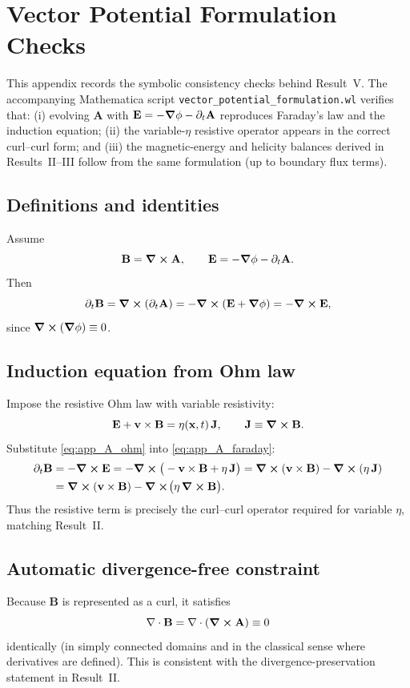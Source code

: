 \documentclass[11pt]{article}
\theoremstyle{plain}
\theoremstyle{definition}
\theoremstyle{remark}
\newcommand{\diver}{\nabla\cdot}
\newcommand{\A}{\mathbf{A}}
\newcommand{\B}{\mathbf{B}}
\newcommand{\E}{\mathbf{E}}
\newcommand{\J}{\mathbf{J}}
\newcommand{\vfield}{\mathbf{v}}
\begin{document}
\section{Vector Potential Formulation Checks}\label{sec:app_vector_potential}

This appendix records the symbolic consistency checks behind Result~V. The accompanying Mathematica
script \texttt{vector\_potential\_formulation.wl} verifies that: (i) evolving $\A$ with
$\E=-\grad\phi-\partial_t\A$ reproduces Faraday's law and the induction equation; (ii) the variable-$\eta$
resistive operator appears in the correct curl--curl form; and (iii) the magnetic-energy and helicity
balances derived in Results~II--III follow from the same formulation (up to boundary flux terms).

\subsection{Definitions and identities}
Assume
\begin{equation}\label{eq:app_A_defs}
  \B = \curl\A,
  \qquad
  \E = -\grad\phi - \partial_t\A.
\end{equation}
Then
\begin{equation}\label{eq:app_A_faraday}
  \partial_t\B
  = \curl(\partial_t\A)
  = -\curl(\E+\grad\phi)
  = -\curl\E,
\end{equation}
since $\curl(\grad\phi)\equiv 0$.

\subsection{Induction equation from Ohm law}
Impose the resistive Ohm law with variable resistivity:
\begin{equation}\label{eq:app_A_ohm}
  \E + \vfield\times\B = \eta(\mathbf{x},t)\,\J,
  \qquad \J \equiv \curl\B.
\end{equation}
Substitute \eqref{eq:app_A_ohm} into \eqref{eq:app_A_faraday}:
\begin{align}\label{eq:app_A_induction}
  \partial_t\B
  &= -\curl\E
   = -\curl\big(-\vfield\times\B + \eta\,\J\big)
   = \curl(\vfield\times\B) - \curl(\eta\,\J) \\
  &= \curl(\vfield\times\B) - \curl\!\big(\eta\,\curl\B\big).
\end{align}
Thus the resistive term is precisely the curl--curl operator required for variable $\eta$, matching
Result~II.

\subsection{Automatic divergence-free constraint}
Because $\B$ is represented as a curl, it satisfies
\begin{equation}\label{eq:app_A_divB}
  \diver\B = \diver(\curl\A) \equiv 0
\end{equation}
identically (in simply connected domains and in the classical sense where derivatives are defined).
This is consistent with the divergence-preservation statement in Result~II.
\end{document}
